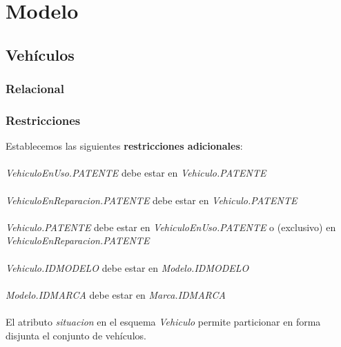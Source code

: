 \section{Modelo}


\subsection{Veh\'iculos}
\subsubsection{Relacional}






\subsubsection{Restricciones}
Establecemos las siguientes \textbf{restricciones adicionales}:
\\
\\
\textit{VehiculoEnUso.PATENTE} debe estar en \textit{Vehiculo.PATENTE}
\\
\\
\textit{VehiculoEnReparacion.PATENTE} debe estar en \textit{Vehiculo.PATENTE}
\\
\\
\textit{Vehiculo.PATENTE} debe estar en \textit{VehiculoEnUso.PATENTE} o
(exclusivo) en \textit{VehiculoEnReparacion.PATENTE}
\\
\\
\textit{Vehiculo.IDMODELO} debe estar en \textit{Modelo.IDMODELO}
\\
\\
\textit{Modelo.IDMARCA} debe estar en \textit{Marca.IDMARCA}
\\
\\
El atributo \textit{situacion} en el esquema \textit{Vehiculo} permite
particionar en forma disjunta el conjunto de veh\'iculos.
\\
\\
